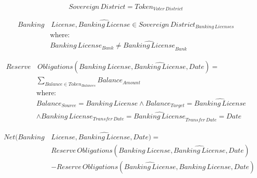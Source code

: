 \documentclass[fleqn]{article}
\begin{document}
	
	\Large
	\begin{equation}
		Sovereign \, District = Token_{Voter \, District} 
	\end{equation}

	\begin{equation}
		\begin{split}
			Banking &\, License, \widehat{Banking \, License} \in Sovereign \, District_{Banking \, Licenses} \\
			& \text{where:} \\
			& Banking \, License_{Bank} \ne \widehat{Banking \, License}_{Bank}
		\end{split}	
	\end{equation}
	
	\begin{equation}
		\begin{split}
			Reserve &\, Obligations (Banking \, License, \widehat{Banking \, License}, Date) = \\
			&\displaystyle\sum_{Balance \in Token_{Balances}} Balance_{Amount} \\
			& \text{where:} \\
			& Balance_{Source} = Banking \, License \land Balance_{Target} = \widehat{Banking \, License} \\
			& \land Banking \, License_{Transfer \, Date} = \widehat{Banking \, License}_{Transfer \, Date} = Date
		\end{split}	
	\end{equation}

	\begin{equation}
		\begin{split}
			Net (Banking \, &License, \widehat{Banking \, License}, Date) = \\
			&Reserve \, Obligations (Banking \, License, \widehat{Banking \, License}, Date) \\
			&-  Reserve \, Obligations (\widehat{Banking \, License}, Banking \, License, Date)
		\end{split}	
	\end{equation}
	
\end{document}
